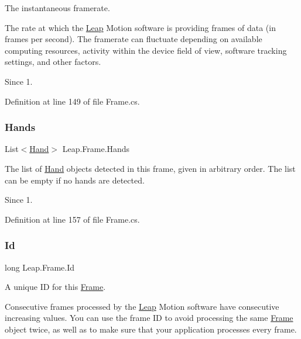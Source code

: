 The instantaneous framerate. 

The rate at which the \mbox{\hyperlink{namespace_leap}{Leap}} Motion software is providing frames of data (in frames per second). The framerate can fluctuate depending on available computing resources, activity within the device field of view, software tracking settings, and other factors.

\begin{DoxySince}{Since}
1. 
\end{DoxySince}


Definition at line 149 of file Frame.\+cs.

\mbox{\label{class_leap_1_1_frame_af0281471fb3831307b40a1124565d069}} 
\subsubsection{\texorpdfstring{Hands}{Hands}}
{\footnotesize\ttfamily List$<$\mbox{\hyperlink{class_leap_1_1_hand}{Hand}}$>$ Leap.\+Frame.\+Hands}



The list of \mbox{\hyperlink{class_leap_1_1_hand}{Hand}} objects detected in this frame, given in arbitrary order. The list can be empty if no hands are detected. 

\begin{DoxySince}{Since}
1. 
\end{DoxySince}


Definition at line 157 of file Frame.\+cs.

\mbox{\label{class_leap_1_1_frame_a0a62a29a5e3e07c16f6f5c2cb52d5e84}} 
\subsubsection{\texorpdfstring{Id}{Id}}
{\footnotesize\ttfamily long Leap.\+Frame.\+Id}



A unique ID for this \mbox{\hyperlink{class_leap_1_1_frame}{Frame}}. 

Consecutive frames processed by the \mbox{\hyperlink{namespace_leap}{Leap}} Motion software have consecutive increasing values. You can use the frame ID to avoid processing the same \mbox{\hyperlink{class_leap_1_1_frame}{Frame}} object twice, as well as to make sure that your application processes every frame.

